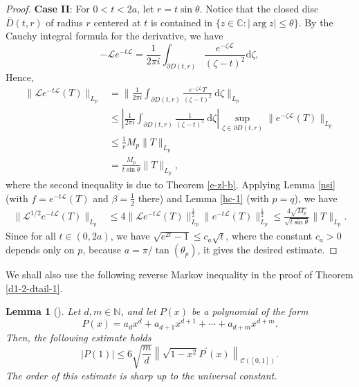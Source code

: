 \documentclass{amsbook}
\newtheorem{lemma}[theorem]{Lemma}
\theoremstyle{definition}
\theoremstyle{remark}
\numberwithin{section}{chapter}
\numberwithin{equation}{chapter}
\newcommand{\1}{\mathbf{1}}
\begin{document}
\begin{proof}
\textbf{Case II}: For $0<t <2 a$, let $r=t \sin \theta$. Notice that the closed disc $\overline{D}(t, r)$ of radius $r$ centered at $t$ is contained in $\{z \in \mathbb{C}:|\arg z| \leq \theta\}$. By the Cauchy integral formula for the derivative, we have
$$
-\mathcal{L} e^{-t \mathcal{L}}=\frac{1}{2 \pi i} \int_{\partial D(t, r)} \frac{e^{-\zeta \mathcal{L}}}{(\zeta-t)^{2}} \mathrm{d} \zeta,
$$
Hence,
\begin{align*}
\|\mathcal{L} e^{-t \mathcal{L}} (T)\|_{L_{p}}&=\Big\|\frac{1}{2 \pi i} \int_{\partial D(t, r)} \frac{e^{-\zeta \mathcal{L}}T}{(\zeta-t)^{2}} \mathrm{~d} \zeta\Big\|_{L_{p}}\\
&\leq\left|\frac{1}{2 \pi i} \int_{\partial D(t, r)} \frac{1}{(\zeta-t)^{2}} \mathrm{~d} \zeta\right|\sup _{\zeta \in \partial D(t, r)}\|e^{-\zeta \mathcal{L}}(T)\|_{L_{p}}\\
& \leq \frac{1}{r} M_p\|T\|_{L_{p}}\\ &= \frac{M_p}{t \sin \theta}\|T\|_{L_{p}},
\end{align*}
where the second inequality is due to Theorem \ref{e-zl-b}. Applying Lemma \ref{nsi} (with $f=e^{-t \mathcal{L}} (T)$ and $\beta=\frac{1}{2}$ there) and Lemma \ref{hc-1} (with $p=q$), we have
\begin{align*}
\|\mathcal{L}^{1/2} e^{-t \mathcal{L}} (T)\|_{L_{p}} &\leq 4\|\mathcal{L}e^{-t \mathcal{L}} (T)\|_{L_{p}}^{\frac{1}{2}}\|e^{-t \mathcal{L}} (T)\|_{L_{p}}^{\frac{1}{2}}\leq\frac{4 \sqrt{M_p}}{\sqrt{t\sin \theta}}\|T\|_{L_{p}}.
\end{align*}
Since for all $t\in (0,2a)$, we have $\sqrt{e^{2 t}-1} \leq c_{a} \sqrt{t}$, where   the constant $c_{a}>0$ depends only on $p$, because $a=\pi/\tan(\theta_p)$, it gives the desired estimate.
\end{proof}

We shall also use the following reverse Markov inequality in the proof of Theorem \ref{d1-2-dtail-1}.
\begin{lemma}[{\cite[Theorem 2.2]{E2020}}]\label{er}
Let $d, m \in \mathbb{N}$, and let $P(x)$ be a polynomial of the form
\[
P(x)=a_{d} x^{d}+a_{d+1} x^{d+1}+\cdots+a_{d+m} x^{d+m}.
\]
Then, the following estimate holds
\[
|P(1)| \leq 6 \sqrt{\frac{m}{d}}\left\|\sqrt{1-x^{2}} P^{\prime}(x)\right\|_{\mathcal{C}([0,1])}.
\]
The order of this estimate is sharp up to the universal constant.
\end{lemma}
\end{document}
